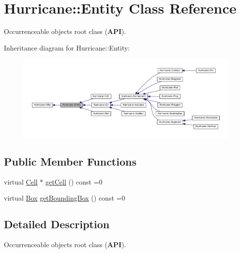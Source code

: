 \hypertarget{classHurricane_1_1Entity}{}\section{Hurricane\+:\+:Entity Class Reference}
\label{classHurricane_1_1Entity}


Occurrenceable objects root class ({\bfseries A\+PI}).  




Inheritance diagram for Hurricane\+:\+:Entity\+:\nopagebreak
\begin{figure}[H]
\begin{center}
\leavevmode
\includegraphics[width=350pt]{classHurricane_1_1Entity__inherit__graph}
\end{center}
\end{figure}
\subsection*{Public Member Functions}
\begin{DoxyCompactItemize}
\item 
virtual \mbox{\hyperlink{classHurricane_1_1Cell}{Cell}} $\ast$ \mbox{\hyperlink{classHurricane_1_1Entity_a42bdf015f583be477cc54b48652b1007}{get\+Cell}} () const =0
\item 
virtual \mbox{\hyperlink{classHurricane_1_1Box}{Box}} \mbox{\hyperlink{classHurricane_1_1Entity_ad834f8ce33a08a13e2a88446696e63e7}{get\+Bounding\+Box}} () const =0
\end{DoxyCompactItemize}


\subsection{Detailed Description}
Occurrenceable objects root class ({\bfseries A\+PI}). 

